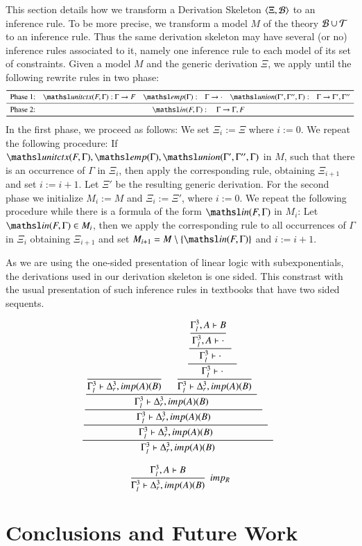 \documentclass[a4paper,10pt]{article}
\newcommand\thSeq{\ensuremath{\Tscr}}
\newcommand{\elin}[2]{\ensuremath{{\tsl{unitctx}(\ensuremath{#1}, \ensuremath{#2})}}}
\newcommand{\emp}[1]{\ensuremath{{\tsl{emp}(\ensuremath{#1})}}}
\newcommand{\union}[3]{\ensuremath{{\tsl{union}(\ensuremath{#1},\ensuremath{#2},\ensuremath{ #3})}}}
\newcommand{\In}[2]{\ensuremath{\tsl{in}(\ensuremath{#1},\ensuremath{#2})}}
\begin{document}
This section details how we transform a Derivation Skeleton $\langle\Xi, {\cal B}\rangle$ to an 
inference rule. To be more precise, we transform a model $M$ of the theory $\Bscr \cup \thSeq$
to an inference rule. Thus the same derivation skeleton may have several (or no) inference rules associated 
to it, namely one inference rule to each model of its set of constraints. Given a model $M$ and the generic
derivation $\Xi$, we apply until the following rewrite rules in two phase:
\[
\begin{array}{l@{\quad}r@{~}l@{\quad}r@{\quad}l@{\quad}r@{\quad}l}
\toprule
{\textrm{Phase 1:}} 
& \elin{F}{\Gamma}:  & \Gamma \rightarrow F 
& \emp{\Gamma}: & \Gamma \rightarrow \cdot 
& \union{\Gamma'}{\Gamma''}{\Gamma}: & \Gamma \rightarrow \Gamma',
\Gamma''\\
\midrule
\textrm{Phase 2:} & \multicolumn{6}{c}{
\In{F}{\Gamma}: \quad \Gamma \rightarrow \Gamma, F
}\\
\bottomrule
\end{array}
\]
In the first phase, we proceed as follows: We set $\Xi_i := \Xi$ where $ i := 0$.
We repeat the following procedure: If 
$\elin{F}{\Gamma}, \emp{\Gamma}, \union{\Gamma'}{\Gamma''}{\Gamma}$ in $M$, such 
that there is an occurrence of $\Gamma$ in $\Xi_i$, then apply the corresponding 
rule, obtaining $\Xi_{i+1}$ and set $i := i + 1$. 
Let $\Xi'$ be the resulting generic derivation.
For the second phase we initialize $M_i := M$ and $\Xi_i := \Xi'$, where $i := 0$. We repeat 
the following procedure while there is a formula of the form $\In{F}{\Gamma}$ in $M_i$:
Let $\In{F}{\Gamma} \in M_i$, then we apply the corresponding rule to all occurrences of $\Gamma$ in $\Xi_i$
obtaining $\Xi_{i+1}$ and set $M_{i+1} = M \setminus \{\In{F}{\Gamma}\}$  and $i := i + 1$.




As we are using the one-sided presentation of linear logic with subexponentials, the derivations used 
in our derivation skeleton is one sided. This constrast with the usual presentation of such inference
rules in textbooks that have two sided sequents. 

{\scriptsize\[\cfrac{\cfrac{\cfrac{\cfrac{\cfrac{}
{\Gamma_{l}^{3}  \vdash \Delta_{r}^{3}, imp (A) (B)  } \;\; 
\quad
\cfrac{\cfrac{\cfrac{\cfrac{\Gamma_{l}^{3}, A  \vdash B }
{\Gamma_{l}^{3}, A  \vdash  \cdot } \;\; }
{\Gamma_{l}^{3}  \vdash  \cdot } \;\; }
{\Gamma_{l}^{3}  \vdash  \cdot } \;\; }
{\Gamma_{l}^{3}  \vdash \Delta_{r}^{3}, imp (A) (B)  } \;\; }
{\Gamma_{l}^{3}  \vdash \Delta_{r}^{3}, imp (A) (B)  } \;\; }
{\Gamma_{l}^{3}  \vdash \Delta_{r}^{3}, imp (A) (B)  } \;\; }
{\Gamma_{l}^{3}  \vdash \Delta_{r}^{3}, imp (A) (B)  } \;\; }
{\Gamma_{l}^{3}  \vdash \Delta_{r}^{3}, imp (A) (B)  } \;\; \]}

{\scriptsize\[\cfrac{\Gamma_{l}^{3}, A  \vdash B }
{\Gamma_{l}^{3}  \vdash \Delta_{r}^{3}, imp (A) (B)  } \;\; imp_{R}\]}


\section{Conclusions and Future Work}



\end{document}
